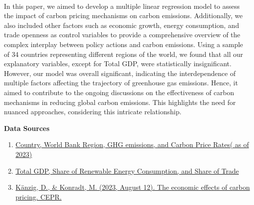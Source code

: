 \documentclass[12pt]{article}
\begin{document}
\paragraph{}
In this paper, we aimed to develop a multiple linear regression model to assess the impact of carbon pricing mechanisms on carbon emissions. Additionally, we also included other factors such as economic growth, energy consumption, and trade openness as control variables to provide a comprehensive overview of the complex interplay between policy actions and carbon emissions. Using a sample of 34 countries representing different regions of the world, we found that all our explanatory variables, except for Total GDP, were statistically insignificant. 
\\[.5\baselineskip]
However, our model was overall significant, indicating the interdependence of multiple factors affecting the trajectory of greenhouse gas emissions. Hence, it aimed to contribute to the ongoing discussions on the effectiveness of carbon mechanisms in reducing global carbon emissions. This highlights the need for nuanced approaches, considering this intricate relationship.


\newpage


\begin{flushleft}
    \begin{Large}
     \textbf{Data Sources}
\end{Large}
\end{flushleft}

\begin{enumerate}
    \item \href{https://carbonpricingdashboard.worldbank.org/map_data}{Country, World Bank Region, GHG emissions, and Carbon Price Rates( as of 2023)}

    \item \href{https://data.worldbank.org/}{Total GDP, Share of Renewable Energy Consumption,  and Share of Trade}

    \item \href{https://cepr.org/voxeu/columns/economic-effects-carbon-pricing}{Känzig, D., \& Konradt, M. (2023, August 12). The economic effects of carbon pricing. CEPR.}
\end{enumerate}
\end{document}
